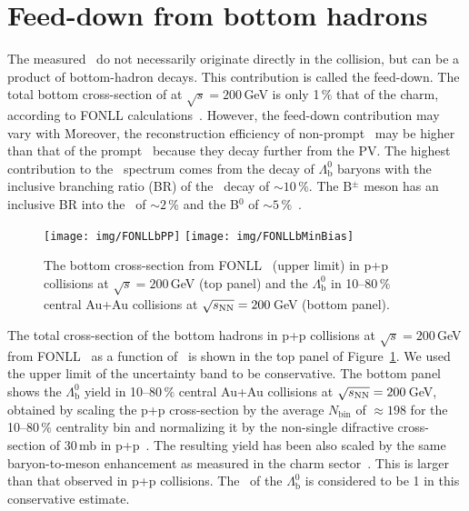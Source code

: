 \section{Feed-down from bottom hadrons}
The measured \Lambdac\ do not necessarily originate directly in the collision, but can be a product of bottom-hadron decays. This contribution is called the feed-down. The total bottom cross-section of at $\sqrt{s} = 200\,$GeV is only 1$\,\%$ that of the charm, according to FONLL calculations~\cite{FONLLcharm}\@. However, the feed-down contribution may vary with \pt\. Moreover, the reconstruction efficiency of non-prompt \Lambdac\ may be higher than that of the prompt \Lambdac\ because they decay further from the PV\@. The highest contribution to the \Lambdacpm\ spectrum comes from the decay of $\Lambda_\mathrm{b}^0$ baryons with the inclusive branching ratio (BR) of the \Lambdacpm\ decay of $\sim10\,\%$\@. The B$^\pm$ meson has an inclusive BR into the \Lambdacpm\ of $\sim 2\,\%$ and the B$^0$ of $\sim5\,\%$~\cite{PDG}\@.

\begin{figure}[!htb]
\centering
\texttt{[image: img/FONLLbPP]}
\texttt{[image: img/FONLLbMinBias]}
\caption[The bottom cross-section from FONLL (upper limit) in p+p collisions and the $\Lambda_\mathrm{b}^0$ in  Au+Au collisions.]{\label{FONLLb} The bottom cross-section from FONLL~\cite{FONLLcharm} (upper limit) in p+p collisions at $\sqrt{s} = 200\,$GeV (top panel) and the $\Lambda_\mathrm{b}^0$ in 10--80$\,\%$ central Au+Au collisions at $\sqrt{s_\text{NN}} = 200\,$GeV (bottom panel)\@.}
\end{figure}


The total cross-section of the bottom hadrons in p+p collisions at $\sqrt{s} = 200\,$GeV from FONLL~\cite{FONLLcharm} as a function of \pt\ is shown in the top panel of Figure~\ref{FONLLb}\@. We used the upper limit of the uncertainty band to be conservative. The bottom panel shows the $\Lambda_\mathrm{b}^0$ yield in 10--80$\,\%$ central Au+Au collisions at $\sqrt{s_\text{NN}} = 200\,$GeV, obtained by scaling the p+p cross-section by the average $N_\mathrm{bin}$ of $\approx 198$ for the 10--80$\,\%$ centrality bin and normalizing it by the non-single difractive cross-section of 30$\,$mb in p+p~\cite{ppCrossSection}\@. The resulting yield has been also scaled by the same baryon-to-meson enhancement as measured in the charm sector~\cite{Tsinghua}\@. This is larger than that observed in p+p collisions. The \Raa\ of the $\Lambda_\mathrm{b}^0$ is considered to be 1 in this conservative estimate.

